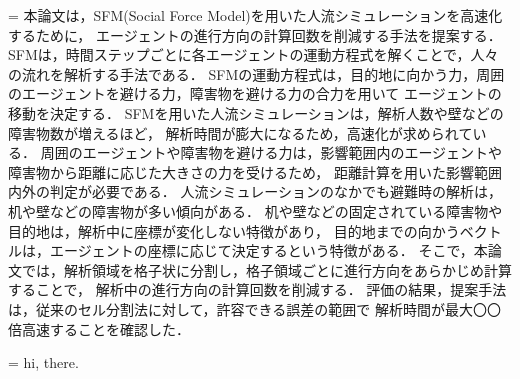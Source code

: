 ={
本論文は，SFM(Social Force Model)を用いた人流シミュレーションを高速化するために，
エージェントの進行方向の計算回数を削減する手法を提案する．
SFMは，時間ステップごとに各エージェントの運動方程式を解くことで，人々の流れを解析する手法である．
SFMの運動方程式は，目的地に向かう力，周囲のエージェントを避ける力，障害物を避ける力の合力を用いて
エージェントの移動を決定する．
SFMを用いた人流シミュレーションは，解析人数や壁などの障害物数が増えるほど，
解析時間が膨大になるため，高速化が求められている．
周囲のエージェントや障害物を避ける力は，影響範囲内のエージェントや障害物から距離に応じた大きさの力を受けるため，
距離計算を用いた影響範囲内外の判定が必要である．
人流シミュレーションのなかでも避難時の解析は，机や壁などの障害物が多い傾向がある．
机や壁などの固定されている障害物や目的地は，解析中に座標が変化しない特徴があり，
目的地までの向かうベクトルは，エージェントの座標に応じて決定するという特徴がある．
そこで，本論文では，解析領域を格子状に分割し，格子領域ごとに進行方向をあらかじめ計算することで，
解析中の進行方向の計算回数を削減する．
評価の結果，提案手法は，従来のセル分割法に対して，許容できる誤差の範囲で
解析時間が最大〇〇倍高速することを確認した．
}

={
hi, there.
}

